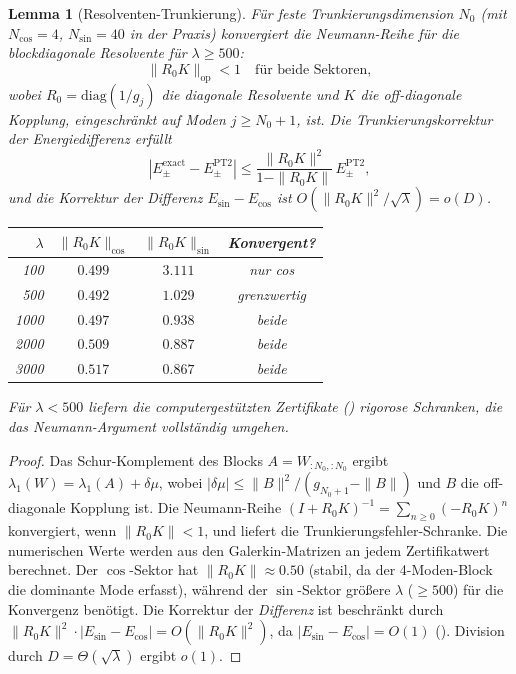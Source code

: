 \documentclass[12pt,a4paper]{article}
\newtheorem{lemma}[theorem]{Lemma}
\theoremstyle{definition}
\theoremstyle{remark}
\begin{document}
\begin{lemma}[Resolventen-Trunkierung]
\label{lem:resolvent-truncation}
Für feste Trunkierungsdimension $N_0$ (mit $N_{\cos} = 4$, $N_{\sin} = 40$ in der Praxis) konvergiert die Neumann-Reihe für die blockdiagonale Resolvente für $\lambda \geq 500$:
\[
  \|R_0 K\|_{\mathrm{op}} < 1 \quad\text{für beide Sektoren},
\]
wobei $R_0 = \mathrm{diag}(1/g_j)$ die diagonale Resolvente und $K$ die off-diagonale Kopplung, eingeschränkt auf Moden $j \geq N_0 + 1$, ist. Die Trunkierungskorrektur der Energiedifferenz erfüllt
\[
  |E^{\mathrm{exact}}_{\pm} - E^{\mathrm{PT2}}_{\pm}| \leq \frac{\|R_0 K\|^2}{1 - \|R_0 K\|}\,E^{\mathrm{PT2}}_{\pm},
\]
und die Korrektur der \emph{Differenz} $E_{\sin} - E_{\cos}$ ist $O(\|R_0 K\|^2 / \sqrt{\lambda}) = o(D)$.

\begin{center}
\small
\renewcommand{\arraystretch}{1.15}
\begin{tabular}{r|cc|c}
$\lambda$ & $\|R_0 K\|_{\cos}$ & $\|R_0 K\|_{\sin}$ & Konvergent? \\\hline
100  & $0.499$ & $3.111$ & nur cos \\
500  & $0.492$ & $1.029$ & grenzwertig \\
1000 & $0.497$ & $0.938$ & beide \\
2000 & $0.509$ & $0.887$ & beide \\
3000 & $0.517$ & $0.867$ & beide
\end{tabular}
\end{center}

\noindent Für $\lambda < 500$ liefern die computergestützten Zertifikate () rigorose Schranken, die das Neumann-Argument vollständig umgehen.
\end{lemma}

\begin{proof}
Das Schur-Komplement des Blocks $A = W_{:N_0,:N_0}$ ergibt $\lambda_1(W) = \lambda_1(A) + \delta\mu$, wobei $|\delta\mu| \leq \|B\|^2/(g_{N_0+1} - \|B\|)$ und $B$ die off-diagonale Kopplung ist. Die Neumann-Reihe $(I + R_0 K)^{-1} = \sum_{n \geq 0} (-R_0 K)^n$ konvergiert, wenn $\|R_0 K\| < 1$, und liefert die Trunkierungsfehler-Schranke. Die numerischen Werte werden aus den Galerkin-Matrizen an jedem Zertifikatwert berechnet. Der $\cos$-Sektor hat $\|R_0 K\| \approx 0.50$ (stabil, da der 4-Moden-Block die dominante Mode erfasst), während der $\sin$-Sektor größere $\lambda$ ($\geq 500$) für die Konvergenz benötigt. Die Korrektur der \emph{Differenz} ist beschränkt durch $\|R_0 K\|^2 \cdot |E_{\sin} - E_{\cos}| = O(\|R_0 K\|^2)$, da $|E_{\sin} - E_{\cos}| = O(1)$ (). Division durch $D = \Theta(\sqrt{\lambda})$ ergibt $o(1)$.
\end{proof}
\end{document}
